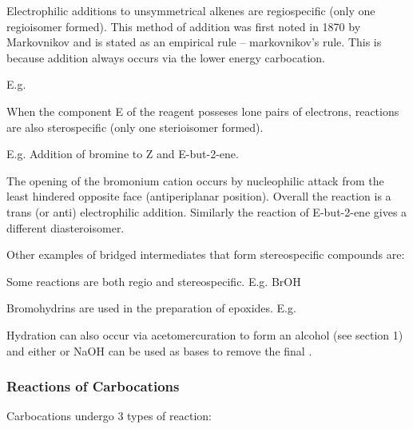 Electrophilic additions to unsymmetrical alkenes are regiospecific (only one
regioisomer formed). This method of addition was first noted in 1870 by Markovnikov
and is stated as an empirical rule -- markovnikov's rule. This is because
addition always occurs via the lower energy carbocation.

E.g.


When the component E of the reagent  posseses lone
pairs of electrons, reactions are also sterospecific (only one sterioisomer formed).

E.g. Addition of bromine to Z and E-but-2-ene.


The opening of the bromonium cation occurs by nucleophilic attack from the least
hindered opposite face (antiperiplanar position). Overall the reaction is a trans
(or anti) electrophilic addition. Similarly the reaction of E-but-2-ene gives a
different diasteroisomer.

Other examples of bridged intermediates that form stereospecific compounds are:


Some reactions are both regio and stereospecific. E.g. BrOH


Bromohydrins are used in the preparation of epoxides. E.g.


Hydration can also occur via acetomercuration to form an alcohol (see section 1)
and either  or NaOH can be used as bases to remove the final .

\subsubsection{Reactions of Carbocations}

Carbocations undergo 3 types of reaction:

